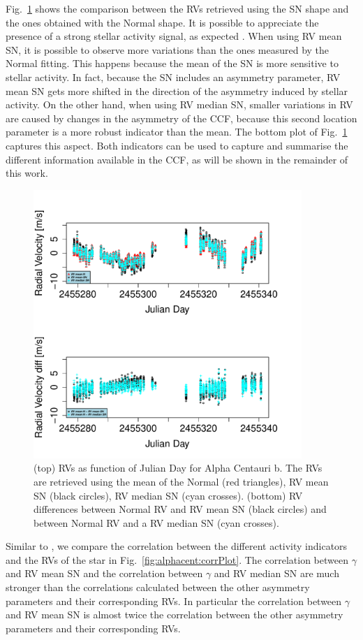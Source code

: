 \documentclass[11pt, oneside]{article}
\begin{document}
{Fig.~\ref{fig:alphacent:diff:RV} shows the comparison between the RVs retrieved using the SN shape and the ones obtained with the Normal shape. It is possible to appreciate the presence of a strong stellar activity signal, as expected \citep{Dumusque-2012,Thompson-2017}. When using RV mean SN, it is possible to observe more variations than the ones measured by the Normal fitting. This happens because the mean of the SN is more sensitive to stellar activity. In fact, because the SN includes an asymmetry parameter, RV mean SN gets more shifted in the direction of the asymmetry induced by stellar activity. On the other hand, when using RV median SN, smaller variations in RV are caused by changes in the asymmetry of the CCF, because this second location parameter is a more robust indicator than the mean. The bottom plot of Fig.~\ref{fig:alphacent:diff:RV} captures this aspect. Both indicators can be used to capture and summarise the different information available in the CCF, as will be shown in the remainder of this work.
%
\begin{figure}[htbp]
   \centering
\includegraphics[height = 4in]{HD12862_[2]RadialVelocityDifferences.pdf} 
   \caption{(top) RVs as function of Julian Day for Alpha Centauri b. The RVs are retrieved using the mean of the Normal (red triangles), RV mean SN (black circles), RV median SN (cyan crosses). (bottom) RV differences between Normal RV and RV mean SN (black circles) and between Normal RV and a RV median SN (cyan crosses).}
   \label{fig:alphacent:diff:RV}
\end{figure}
%

Similar to \citet{Figueira-2013}, we compare the correlation between the different activity indicators and the RVs of the star in Fig.~\ref{fig:alphacent:corrPlot}. The correlation between $\gamma$ and RV mean SN and the correlation between $\gamma$ and RV median SN are much stronger than the correlations calculated between the other asymmetry parameters and their corresponding RVs. In particular the correlation between $\gamma$ and RV mean SN is almost twice the correlation between the other asymmetry parameters and their corresponding RVs.

}
\end{document}

